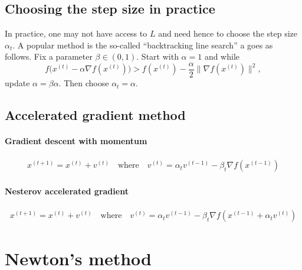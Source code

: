\documentclass[11pt,nocut]{article}
\begin{document}
\subsection{Choosing the step size in practice}

In practice, one may not have access to $L$ and need hence to choose the step size $\alpha_t$. A popular method is the so-called ``backtracking line search'' a goes as follows.
Fix a parameter $\beta \in (0,1)$.
Start with $\alpha = 1$ and while
$$
f\big(x^{(t)} - \alpha \nabla f (x^{(t)}) \big) > f(x^{(t)}) - \frac{\alpha}{2} \|\nabla f(x^{(t)}) \|^2,
$$
update $\alpha =\beta \alpha$. Then choose $\alpha_t = \alpha$.

\subsection{Accelerated gradient method}

\paragraph{Gradient descent with momentum}

\begin{align*}
	x^{(t+1)} = x^{(t)} + v^{(t)}
	\quad \text{where} \quad
	v^{(t)} = \alpha_t v^{(t-1)} - \beta_t \nabla f(x^{(t-1)})
\end{align*}

\paragraph{Nesterov accelerated gradient}

\begin{align*}
	x^{(t+1)} = x^{(t)} + v^{(t)}
	\quad \text{where} \quad
	v^{(t)} = \alpha_t v^{(t-1)} - \beta_t \nabla f(x^{(t-1)} + \alpha_t v^{(t)})
\end{align*}


\section{Newton's method}
\end{document}
